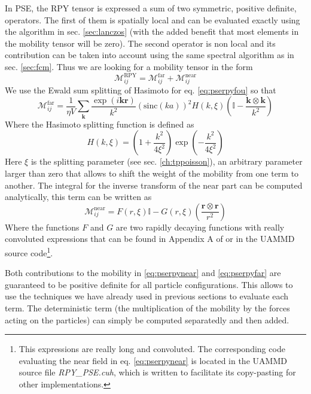 \documentclass[ twoside,openright,titlepage,numbers=noenddot,%
headinclude,footinclude,cleardoublepage=empty,abstract=on,
BCOR=5mm,paper=a4,fontsize=11pt, dvipsnames
]{scrreprt}
\renewcommand{\vec}[1]{\bm{#1}}
\newcommand{\tens}[1]{\bm{\mathcal{#1}}}
\newcommand{\uammd}{\gls{UAMMD}\xspace}
\newcommand{\sinc}{\textrm{sinc}}
\newcommand{\near}{\textrm{near}}
\newcommand{\far}{\textrm{far}}
\begin{document}
In \gls{PSE}, the \gls{RPY} tensor is expressed a sum of two symmetric, positive definite, operators. The first of them is spatially local and can be evaluated exactly using the algorithm in sec. \ref{sec:lanczos} (with the added benefit that most elements in the mobility tensor will be zero). The second operator is non local and its contribution can be taken into account using the same spectral algorithm as in sec. \ref{sec:fcm}.
Thus we are looking for a mobility tensor in the form
\begin{equation}
  \label{eq:psemobsep}
  \tens{M}_{ij}^{\textrm{RPY}} = \tens{M}_{ij}^{\far} + \tens{M}^{ \near}_{ij}
\end{equation}
We use the Ewald sum splitting of Hasimoto\cite{Hasimoto1959} for eq. \eqref{eq:pserpyfou} so that
\begin{equation}
  \label{eq:pserpyfar}
  \tens{M}_{ij}^{\far}= \frac{1}{\eta V} \sum_{\vec{k}} \frac{\exp(i\vec{k}\vec{r})}{k^2}\left(\sinc(ka) \right)^2H(k,\xi)\left(\mathbb{I} - \frac{\vec{k}\otimes\vec{k}}{k^2}\right)
\end{equation}
Where the Hasimoto splitting function is defined as
\begin{equation}
  \label{eq:psehasimoto}
  H(k,\xi) = \left(1 + \frac{k^2}{4\xi^2}\right)\exp\left(-\frac{k^2}{4\xi^2}\right)
\end{equation}
Here $\xi$ is the splitting parameter (see sec. \ref{ch:tppoisson}), an arbitrary parameter larger than zero that allows to shift the weight of the mobility from one term to another.
The integral for the inverse transform of the near part can be computed analytically, this term can be written as
\begin{equation}
  \label{eq:pserpynear}
  \tens{M}_{ij}^{\near}= F(r,\xi)\mathbb I - G(r,\xi)\left(\frac{\vec{r}\otimes\vec{r}}{r^2}\right)
\end{equation}
Where the functions $F$ and $G$ are two rapidly decaying functions with really convoluted expressions that can be found in Appendix A of\cite{Fiore2017} or in the \uammd source code\footnote{This expressions are really long and convoluted. The corresponding code evaluating the near field in eq. \eqref{eq:pserpynear} is located in the \uammd source file \emph{RPY\_PSE.cuh}, which is written to facilitate its copy-pasting for other implementations.}.

Both contributions to the mobility in \eqref{eq:pserpynear} and \eqref{eq:pserpyfar} are guaranteed to be positive definite for all particle configurations.
This allows to use the techniques we have already used in previous sections to evaluate each term. The deterministic term (the multiplication of the mobility by the forces acting on the particles) can simply be computed separatedly and then added.
\end{document}
